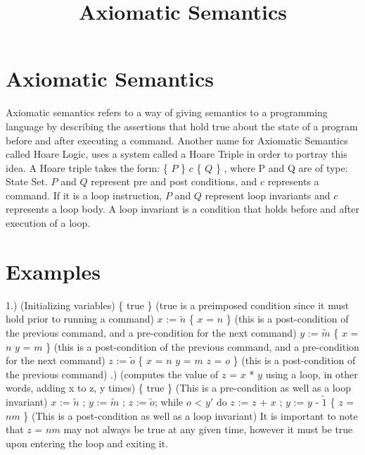 \documentclass{lecturenotes}
\title{Axiomatic Semantics}
\begin{document}
\maketitle

\section{Axiomatic Semantics}

Axiomatic semantics refers to a way of giving semantics to a programming language by
describing the assertions that hold true about the state of a program before and after executing a command.
Another name for Axiomatic Semantics called Hoare Logic, uses a system called a Hoare Triple in order to portray this idea.
A Hoare triple takes the form: \{ $P$ \} $c$ \{ $Q$ \} , where P and Q are of type: State \rightarrow \; Set.
$P$ and $Q$ represent pre and post conditions, and $c$ represents a command.
If it is a loop instruction, $P$ and $Q$ represent loop invariants and $c$ represents a loop body.
A loop invariant is a condition that holds before and after execution of a loop. \newline

\section{Examples}
1.) (Initializing variables) \newline
\{ true \} (true is a preimposed condition since it must hold prior to running a command) \newline
$x$ := $\tilde{n}$ \newline
\{ $x$ = $n$ \} (this is a post-condition of the previous command, and a pre-condition for the next command) \newline
$y$ := $\tilde{m}$ \newline
\{ $x$ = $n$ \wedge \;$y$ = $m$ \} (this is a post-condition of the previous command, and a pre-condition for the next command) \newline
$z$ := $\tilde{o}$ \newline
\{ $x$ = $n$ \wedge \;$y$ = $m$ \wedge \;$z$ = $o$ \} (this is a post-condition of the previous command) \newline
{}.) (computes the value of $z$ = $x$ * $y$ using a loop, in other words, adding x to z, y times) \newline
\{ true \} (This is a pre-condition as well as a loop invariant) \newline
$x$ := $\tilde{n}$ ; $y$ := $\tilde{m}$ ; $z$ := $\tilde{o}$; \newline
while $o$ < $y'$ do \newline
$z$ := $z$ + $x$ ; \newline
$y$ := $y$ - $\tilde{1}$ \newline
\{ $z$ = $nm$ \} (This is a post-condition as well as a loop invariant) \newline
It is important to note that $z$ = $nm$ may not always be true at any given time, \newline
however it must be true upon entering the loop and exiting it. \newline
\end{document}
